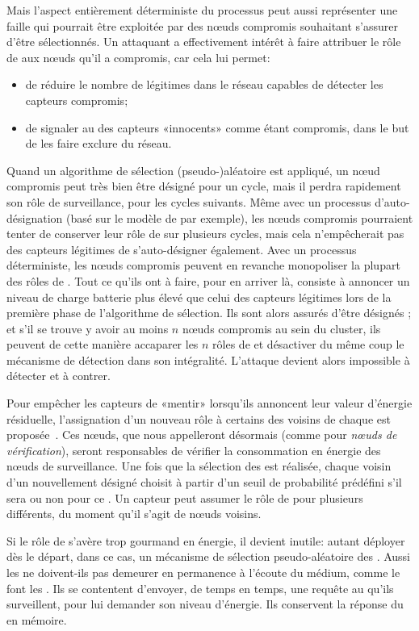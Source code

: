 Mais l'aspect entièrement déterministe du processus peut aussi représenter une faille qui pourrait être exploitée par des nœuds compromis souhaitant s'assurer d'être sélectionnés.
Un attaquant a effectivement intérêt à faire attribuer le rôle de \cn aux nœuds qu'il a compromis, car cela lui permet:
\begin{itemize}
    \item de réduire le nombre de \cns légitimes dans le réseau capables de détecter les capteurs compromis;
    \item de signaler au \ch des capteurs «innocents» comme étant compromis, dans le but de les faire exclure du réseau.
\end{itemize}
Quand un algorithme de sélection (pseudo-)aléatoire est appliqué, un nœud compromis peut très bien être désigné pour un cycle, mais il perdra rapidement son rôle de surveillance, pour les cycles suivants.
Même avec un processus d'auto-désignation (basé sur le modèle de \leach par exemple), les nœuds compromis pourraient tenter de conserver leur rôle de \cn sur plusieurs cycles, mais cela n'empêcherait pas des capteurs légitimes de s'auto-désigner également.
Avec un processus déterministe, les nœuds compromis peuvent en revanche monopoliser la plupart des rôles de \cns.
Tout ce qu'ils ont à faire, pour en arriver là, consiste à annoncer un niveau de charge batterie plus élevé que celui des capteurs légitimes lors de la première phase de l'algorithme de sélection.
Ils sont alors assurés d'être désignés \cns; et s'il se trouve y avoir au moins $n$ nœuds compromis au sein du cluster, ils peuvent de cette manière accaparer les $n$ rôles de \cn et désactiver du même coup le mécanisme de détection dans son intégralité.
L'attaque devient alors impossible à détecter et à contrer.

Pour empêcher les capteurs de «mentir» lorsqu'ils annoncent leur valeur d'énergie résiduelle, l'assignation d'un nouveau rôle à certains des voisins de chaque \cn est proposée~\cite{MMB14,MM15}.
Ces nœuds, que nous appelleront désormais \vns (comme pour \textit{nœuds de vérification}), seront responsables de vérifier la consommation en énergie des nœuds de surveillance.
Une fois que la sélection des \cns est réalisée, chaque voisin d'un \cn nouvellement désigné choisit à partir d'un seuil de probabilité prédéfini s'il sera ou non \vn pour ce \cn.
Un capteur peut assumer le rôle de \vn pour plusieurs \cn différents, du moment qu'il s'agit de nœuds voisins.

Si le rôle de \vn s'avère trop gourmand en énergie, il devient inutile: autant déployer dès le départ, dans ce cas, un mécanisme de sélection pseudo-aléatoire des \cns.
Aussi les \vns ne doivent-ils pas demeurer en permanence à l'écoute du médium, comme le font les \cns.
Ils se contentent d'envoyer, de temps en temps, une requête au \cn qu'ils surveillent, pour lui demander son niveau d'énergie.
Ils conservent la réponse du \cn en mémoire.

